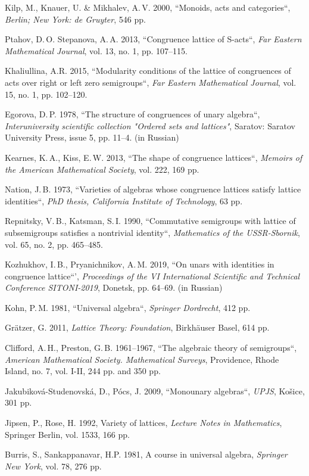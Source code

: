 \documentclass[11pt,twoside,final
]{article}
\begin{document}
\begin{engbibliography}{99}
	
	Kilp, M., Knauer, U. \& Mikhalev, A.\,V. 2000, ``Monoids, acts and categories``, \textit{Berlin; New York: de Gruyter}, 546 pp.
	
	Ptahov, D.\,O. Stepanova, A.\,A. 2013, ``Congruence lattice of S-acts``, \textit{Far Eastern Mathematical Journal}, vol. 13, no. 1, pp. 107--115.
	
	Khaliullina, A.R. 2015, ``Modularity conditions of the lattice of congruences of acts over right or left zero semigroups``, \textit{Far Eastern Mathematical Journal}, vol. 15, no. 1, pp. 102--120.
	
	Egorova, D.\,P. 1978, ``The structure of congruences of unary algebra``, \textit{Interuniversity scientific collection "Ordered sets and lattices"}, Saratov: Saratov University Press, issue 5, pp. 11--4. (in Russian)
	
	Kearnes, K.\,A., Kiss, E.\,W. 2013, ``The shape of congruence lattices``, \textit{Memoirs of the American Mathematical Society}, vol. 222, 169 pp.
	
	Nation, J.\,B. 1973, ``Varieties of algebras whose congruence lattices satisfy lattice identities``, \textit{PhD thesis, California Institute of Technology}, 63 pp.
	
	Repnitsky, V.\,B., Katsman, S.\,I. 1990, ``Commutative semigroups with lattice of subsemigroups satisfies a nontrivial identity``, \textit{Mathematics of the USSR-Sbornik}, vol. 65, no. 2, pp. 465--485.
	
	Kozhukhov, I.\,B., Pryanichnikov, A.\,M. 2019, ``On unars with identities in congruence lattice``', \textit{Proceedings of the VI International Scientific and Technical Conference SITONI-2019}, Donetsk, pp. 64--69. (in Russian)
	
	Kohn, P.\,M. 1981, ``Universal algebra``, \textit{Springer Dordrecht}, 412 pp.
	
	Grätzer, G. 2011, \textit{Lattice Theory: Foundation}, Birkhäuser Basel, 614 pp.
	
	Clifford, A.\,H., Preston, G.\,B. 1961--1967, ``The algebraic theory of semigroups``, \textit{American Mathematical Society. Mathematical Surveys}, Providence, Rhode Island, no. 7, vol. I-II, 244 pp. and 350 pp.
	
	Jakubiková-Studenovská, D., Pócs, J. 2009, ``Monounary algebras``, \textit{UPJS}, Košice, 301 pp.
	
	Jipsen, P., Rose, H. 1992, Variety of lattices, \textit{Lecture Notes in Mathematics}, Springer Berlin, vol. 1533, 166 pp.
	
	Burris, S., Sankappanavar, H.P. 1981, A course in universal algebra, \textit{Springer New York}, vol. 78, 276 pp.
	
\end{engbibliography}

\label{end}
\end{document}
